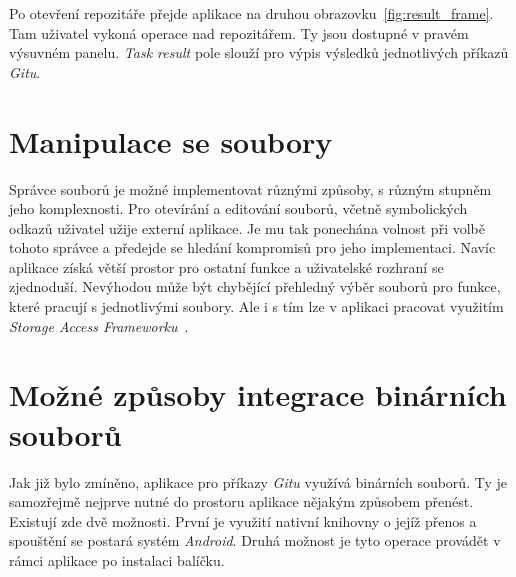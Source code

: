 Po otevření repozitáře přejde aplikace na druhou obrazovku~\ref{fig:result_frame}. Tam uživatel vykoná operace nad repozitářem. Ty jsou dostupné v pravém výsuvném panelu. \emph{Task result} pole slouží pro výpis výsledků jednotlivých příkazů \emph{Gitu}.

\section{Manipulace se soubory}
Správce souborů je možné implementovat různými způsoby, s různým stupněm jeho komplexnosti. Pro otevírání a editování souborů, včetně symbolických odkazů uživatel užije externí aplikace. Je mu tak ponechána volnost při volbě tohoto správce a předejde se hledání kompromisů pro jeho implementaci. Navíc aplikace získá větší prostor pro ostatní funkce a uživatelské rozhraní se zjednoduší. Nevýhodou může být chybějící přehledný výběr souborů pro funkce, které pracují s jednotlivými soubory. Ale i s tím lze v aplikaci pracovat využitím \emph{Storage Access Frameworku}~.

\section{Možné způsoby integrace binárních souborů}
Jak již bylo zmíněno, aplikace pro příkazy \emph{Gitu} využívá binárních souborů. Ty je samozřejmě nejprve nutné do prostoru aplikace nějakým způsobem přenést. Existují zde dvě možnosti. První je využití nativní knihovny o jejíž přenos a spouštění se postará systém \emph{Android}. Druhá možnost je tyto operace provádět v rámci aplikace po instalaci balíčku.

